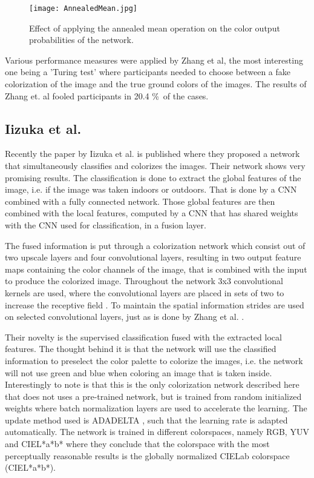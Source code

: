 \begin{figure}[h]
\centering
	\texttt{[image: AnnealedMean.jpg]}
\centering
\caption{Effect of applying the annealed mean operation on the  color output probabilities of the network.}
\label{fig:anmean}
\end{figure}

Various performance measures were applied by Zhang et al, the most interesting one being a 'Turing test' where participants needed to choose between a fake colorization of the image and the true ground colors of the images. The results of Zhang et. al fooled participants in 20.4 \%\ of the cases. 



\subsection{Iizuka et al.}
Recently the paper by Iizuka et al. \cite{IizukaSIGGRAPH2016} is published where they proposed a network that simultaneously classifies and colorizes the images. Their network shows very promising results. The classification is done to extract the global features of the image, i.e. if the image was taken indoors or outdoors. That is done by a CNN combined with a fully connected network. Those global features are then combined with the local features, computed by a CNN that has shared weights with the CNN used for classification, in a fusion layer.

The fused information is put through a colorization network which consist out of two upscale layers and four convolutional layers, resulting in two output feature maps containing the color channels of the image, that is combined with the input to produce the colorized image. 
Throughout the network 3x3 convolutional kernels are used, where the convolutional layers are placed in sets of two to increase the receptive field \cite{Simonyan}. To maintain the spatial information strides are used  on selected convolutional layers, just as is done by Zhang et al. \cite{Zhang}.

Their novelty is the supervised classification fused with the extracted local features. The thought behind it is that the network will use the classified information to preselect the color palette to colorize the images, i.e. the network will not use green and blue when coloring an image that is taken inside.
Interestingly to note is that this is the only colorization network described here that does not uses a pre-trained network, but is trained from random initialized weights where batch normalization layers are used to accelerate the learning. The update method used is ADADELTA \cite{zeiler2012adadelta}, such that the learning rate is adapted automatically. 
The network is trained in different colorspaces, namely RGB, YUV and CIEL*a*b* where they conclude that the colorspace with the most perceptually reasonable results is the globally normalized CIELab colorspace (CIEL*a*b*).


